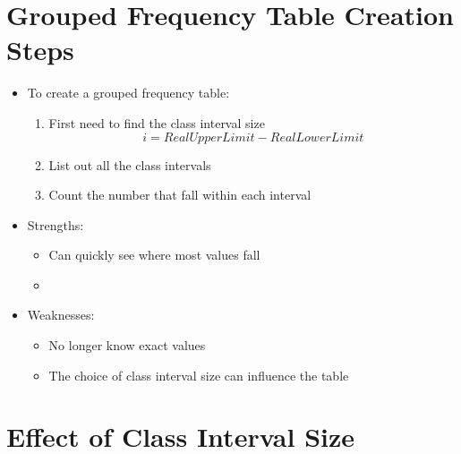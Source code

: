\documentclass[12pt]{article}
\begin{document}
\newpage
\section{Grouped Frequency Table Creation
Steps}\label{grouped-frequency-table-creation-steps}

\begin{itemize}
\itemsep1pt\parskip0pt
\item
  To create a grouped frequency table:

  \begin{enumerate}
  \def\labelenumi{\arabic{enumi}.}
  \itemsep1pt\parskip0pt
  \item
    First need to find the class interval size
    \[ i = Real Upper Limit - Real Lower Limit \]
  \item
    List out all the class intervals
  \item
    Count the number that fall within each interval
  \end{enumerate}
\item
  Strengths:

  \begin{itemize}
  \item
    Can quickly see where most values fall
  \item
  \end{itemize}
\item
  Weaknesses:

  \begin{itemize}
  \itemsep1pt\parskip0pt
  \item
    No longer know exact values
  \item
    The choice of class interval size can influence the table
  \end{itemize}
\end{itemize}

\newpage
\section{Effect of Class Interval
Size}\label{effect-of-class-interval-size}
\end{document}
